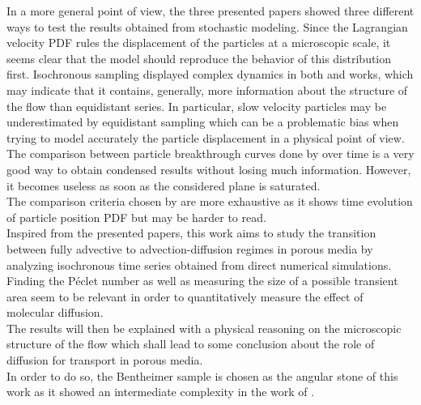 In a more general point of view, the three presented papers showed three different ways to test the results obtained from stochastic modeling. 
Since the Lagrangian velocity PDF rules the displacement of the particles at a microscopic scale, it seems clear that the model should reproduce the behavior of this distribution first.
Isochronous sampling displayed complex dynamics in both \citet{Meyer2016} and \citet{Puyguiraud2019} works, which may indicate that it contains, generally, more information about the structure of the flow than equidistant series.
In particular, slow velocity particles may be underestimated by equidistant sampling which can be a problematic bias when trying to model accurately the particle displacement in a physical point of view.\\
The comparison between particle breakthrough curves done by \citet{Dentz2017} over time is a very good way to obtain condensed results without losing much information. However, it becomes useless as soon as the considered plane is saturated.\\
The comparison criteria chosen by \citet{Meyer2016} are more exhaustive as it shows time evolution of particle position PDF but may be harder to read.\\

Inspired from the presented papers, this work aims to study the transition between fully advective to advection-diffusion regimes in porous media by analyzing isochronous time series obtained from direct numerical simulations. 
Finding the Péclet number as well as measuring the size of a possible transient area seem to be relevant in order to quantitatively measure the effect of molecular diffusion.\\
The results will then be explained with a physical reasoning on the microscopic structure of the flow which shall lead to some conclusion about the role of diffusion for transport in porous media.\\
In order to do so, the Bentheimer sample is chosen as the angular stone of this work as it showed an intermediate complexity in the work of \citet{Meyer2016}.
